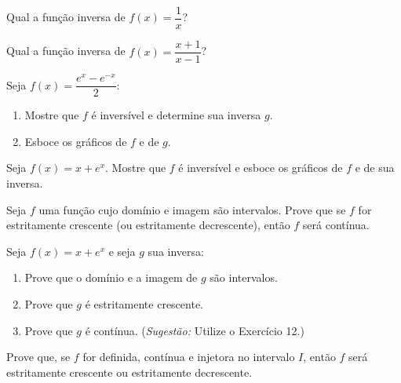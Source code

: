 \begin{exercicio}[8]
Qual a função inversa de $f(x) = \dfrac{1}{x}$?
\end{exercicio}

\begin{exercicio}[9]
Qual a função inversa de $f(x) = \dfrac{x + 1}{x - 1}$?
\end{exercicio}

\begin{exercicio}[10]
Seja $f(x) = \dfrac{e^x - e^{-x}}{2}$:
\begin{enumerate}[label=\alph*)]
    \item Mostre que $f$ é inversível e determine sua inversa $g$.
    \item Esboce os gráficos de $f$ e de $g$.
\end{enumerate}
\end{exercicio}

\begin{exercicio}[11]
Seja $f(x) = x + e^x$. Mostre que $f$ é inversível e esboce os gráficos de $f$ e de sua inversa.
\end{exercicio}

\begin{exercicio}[12]
Seja $f$ uma função cujo domínio e imagem são intervalos. Prove que se $f$ for estritamente crescente (ou estritamente decrescente), então $f$ será contínua.
\end{exercicio}

\begin{exercicio}[13]
Seja $f(x) = x + e^x$ e seja $g$ sua inversa:
\begin{enumerate}[label=\alph*)]
    \item Prove que o domínio e a imagem de $g$ são intervalos.
    \item Prove que $g$ é estritamente crescente.
    \item Prove que $g$ é contínua. (\textit{Sugestão:} Utilize o Exercício 12.)
\end{enumerate}
\end{exercicio}

\begin{exercicio}[14]
Prove que, se $f$ for definida, contínua e injetora no intervalo $I$, então $f$ será estritamente crescente ou estritamente decrescente.
\end{exercicio}

\clearpage

